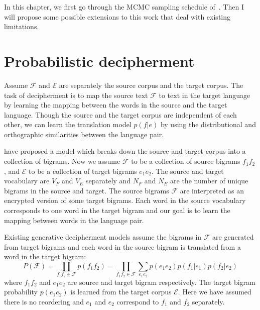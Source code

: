 In this chapter, we first go through the MCMC sampling schedule of~. Then I will propose some possible extensions
to this work that deal with existing limitations.

\section{Probabilistic decipherment}
Assume $\mathcal{F}$ and $\mathcal{E}$ are separately the source corpus and the target corpus. 
The task of decipherment is to map the source text $\mathcal{F}$ to text in the target language by learning the mapping between the words in the source and the target language. 
Though the source and the target corpus are independent of each other, we can learn the translation model $p(f|e)$ by using the distributional and orthographic similarities
between the language pair.


 have proposed a model which breaks down the source and target corpus into a collection of bigrams.
Now we assume $\mathcal{F}$ to be a collection of source bigrams $f_1 f_2$, and $\mathcal{E}$ to be a collection of target bigrams $e_1 e_2$. 
The source and target vocabulary are $V_F$ and $V_E$ separately and $N_F$ and $N_E$ are the number of unique bigrams in the source and target.
The source bigrams $\mathcal{F}$ are interpreted as an encrypted version of some target bigrams. Each word in the source vocabulary corresponds to one word
in the target bigram and our goal is to learn the mapping between words in the language pair.


Existing generative decipherment models assume the bigrams in $\mathcal{F}$ are generated from target bigrams and each word in the source bigram is translated from 
a word in the target bigram:
\begin{equation}
P(\mathcal{F}) = \prod_{f_1 f_2 \in \mathcal{F}} p(f_1 f_2)
 = \prod_{f_1f_2 \in \mathcal{F}} \sum_{e_1e_2} p(e_1 e_2) p(f_1|e_1) p(f_2|e_2) 
\end{equation}
where $f_1 f_2$ and $e_1 e_2$ are source and target bigram respectively.
The target bigram probability $p(e_1 e_2)$ is learned from the target corpus $\mathcal{E}$. 
Here we have assumed there is no reordering and $e_1$ and $e_2$ correspond to $f_1$ and $f_2$ separately.
 
